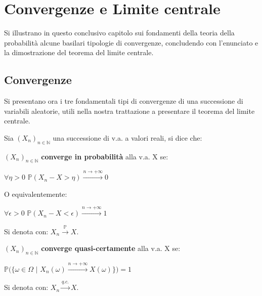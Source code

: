 \section{Convergenze e Limite centrale}

Si illustrano in questo conclusivo capitolo sui fondamenti della teoria della probabilità alcune basilari tipologie di convergenze, concludendo con l'enunciato e la dimostrazione del teorema del limite centrale.

\vspace{10px}

\subsection{Convergenze}

Si presentano ora i tre fondamentali tipi di convergenze di una successione di variabili aleatorie, utili nella nostra trattazione a presentare il teorema del limite centrale.

\vspace{15px}
\newline
\noindent
Sia $(X_n)_{n\in\mathbb{N}}$ una successione di v.a. a valori reali, si dice che:

\begin{definition}
$(X_n)_{n\in\mathbb{N}}$ \textbf{converge in probabilità} alla v.a. X se:
\begin{center}
$\forall \eta > 0$ \hspace{4px} $\mathbb{P}(X_n-X>\eta)\xrightarrow{n\to+\infty}0$    
\end{center}
O equivalentemente:
\begin{center}
$\forall \epsilon > 0$ \hspace{4px} $\mathbb{P}(X_n-X<\epsilon)\xrightarrow{n\to+\infty}1$
\end{center}
Si denota con: $X_n\xrightarrow{\mathbb{P}}X$.
\end{definition}

\vspace{5px}

\begin{definition}
$(X_n)_{n\in\mathbb{N}}$ \textbf{converge quasi-certamente} alla v.a. X se:
\begin{center}
    $\mathbb{P}(\{\omega\in\Omega$ $|$ $X_n(\omega)\xrightarrow{n\to+\infty}X(\omega)\}) = 1$
\end{center}
Si denota con: $X_n\xrightarrow{q.c.}X$.
\end{definition}

